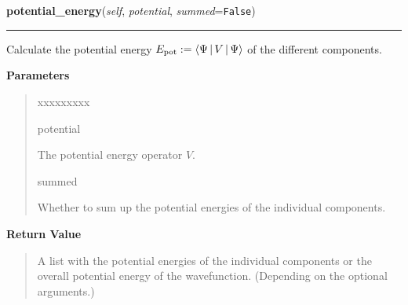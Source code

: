 \hspace{.8\funcindent}\begin{boxedminipage}{\funcwidth}

    \raggedright \textbf{potential\_energy}(\textit{self}, \textit{potential}, \textit{summed}={\tt False})

    \vspace{-1.5ex}

    \rule{\textwidth}{0.5\fboxrule}
\setlength{\parskip}{2ex}
    Calculate the potential energy $E_{\text{pot}} :=
    \Braket{\Psi|V|\Psi}$
    of the different components.

\setlength{\parskip}{1ex}
      \textbf{Parameters}
      \vspace{-1ex}

      \begin{quote}
        \begin{Ventry}{xxxxxxxxx}

          \item[potential]

          The potential energy operator $V$.

          \item[summed]

          Whether to sum up the potential energies of the individual
          components.

        \end{Ventry}

      \end{quote}

      \textbf{Return Value}
    \vspace{-1ex}

      \begin{quote}
      A list with the potential energies of the individual components or
      the overall potential energy of the wavefunction. (Depending on the
      optional arguments.)

      \end{quote}

    \end{boxedminipage}

